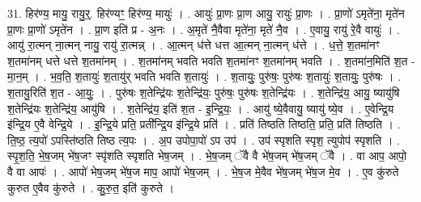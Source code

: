 \documentclass[17pt]{extarticle}
\begin{document}
31. हिर॑ण्य॒ मायु॒ रायु॒र्॒. हिर॑ण्यꣳ॒॒ हिर॑ण्य॒ मायुः॑ । . आयुः॑ प्रा॒णः प्रा॒ण आयु॒ रायुः॑ प्रा॒णः । . प्रा॒णो॑ ऽमृते॑ना॒ मृते॑न प्रा॒णः प्रा॒णो॑ ऽमृते॑न । . प्रा॒ण इति॑ प्र - अ॒नः । . अ॒मृते॑ नै॒वैवा मृते॑ना॒ मृते॑ नै॒व । . ए॒वायु॒ रायु॑ रे॒वै वायुः॑ । . आयु॑ रा॒त्मन् ना॒त्मन् नायु॒ रायु॑ रा॒त्मन्न् । . आ॒त्मन् ध॑त्ते धत्त आ॒त्मन् ना॒त्मन् ध॑त्ते । . ध॒त्ते॒ श॒तमा॑नꣳ श॒तमा॑नम् धत्ते धत्ते श॒तमा॑नम् । . श॒तमा॑नम् भवति भवति श॒तमा॑नꣳ श॒तमा॑नम् भवति । . श॒तमा॑न॒मिति॑ श॒त - मा॒न॒म् । . भ॒व॒ति॒ श॒तायुः॑ श॒तायु॑र् भवति भवति श॒तायुः॑ । . श॒तायुः॒ पुरु॑षः॒ पुरु॑षः श॒तायुः॑ श॒तायुः॒ पुरु॑षः । . श॒तायु॒रिति॑ श॒त - आ॒युः॒ । . पुरु॑षः श॒तेन्द्रि॑यः श॒तेन्द्रि॑यः॒ पुरु॑षः॒ पुरु॑षः श॒तेन्द्रि॑यः । . श॒तेन्द्रि॑य॒ आयु॒ ष्यायु॑षि श॒तेन्द्रि॑यः श॒तेन्द्रि॑य॒ आयु॑षि । . श॒तेन्द्रि॑य॒ इति॑ श॒त - इ॒न्द्रि॒यः॒ । . आयु॑ ष्ये॒वैवायु॒ ष्यायु॑ ष्ये॒व । . ए॒वेन्द्रि॒य इ॑न्द्रि॒य ए॒वै वेन्द्रि॒ये । . इ॒न्द्रि॒ये प्रति॒ प्रती᳚न्द्रि॒य इ॑न्द्रि॒ये प्रति॑ । . प्रति॑ तिष्ठति तिष्ठति॒ प्रति॒ प्रति॑ तिष्ठति । . ति॒ष्ठ॒ त्य॒पो॑ ऽपस्ति॑ष्ठति तिष्ठ त्य॒पः । . अ॒प उपोपा॒पो॑ ऽप उप॑ । . उप॑ स्पृशति स्पृश॒ त्युपोप॑ स्पृशति । . स्पृ॒श॒ति॒ भे॒ष॒जम् भे॑ष॒जꣳ स्पृ॑शति स्पृशति भेष॒जम् । . भे॒ष॒जम् ॅवै वै भे॑ष॒जम् भे॑ष॒जम् ॅवै । . वा आप॒ आपो॒ वै वा आपः॑ । . आपो॑ भेष॒जम् भे॑ष॒ज माप॒ आपो॑ भेष॒जम् । . भे॒ष॒ज मे॒वैव भे॑ष॒जम् भे॑ष॒ज मे॒व । . ए॒व कु॑रुते कुरुत ए॒वैव कु॑रुते । . कु॒रु॒त॒ इति॑ कुरुते । \newline
\end{document}
